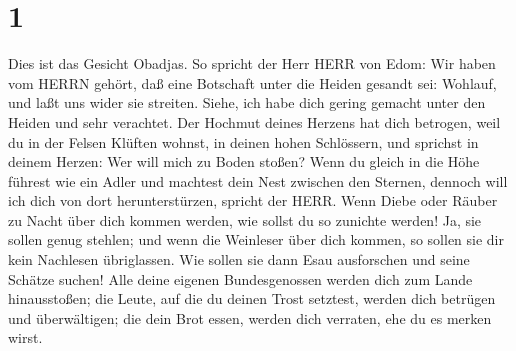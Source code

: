 \hypertarget{section}{%
\section{1}\label{section}}

 Dies ist das Gesicht Obadjas. So spricht der Herr HERR von
Edom: Wir haben vom HERRN gehört, daß eine Botschaft unter die Heiden
gesandt sei: Wohlauf, und laßt uns wider sie streiten. 
Siehe, ich habe dich gering gemacht unter den Heiden und sehr verachtet.
 Der Hochmut deines Herzens hat dich betrogen, weil du in
der Felsen Klüften wohnst, in deinen hohen Schlössern, und sprichst in
deinem Herzen: Wer will mich zu Boden stoßen?  Wenn du
gleich in die Höhe führest wie ein Adler und machtest dein Nest zwischen
den Sternen, dennoch will ich dich von dort herunterstürzen, spricht der
HERR.  Wenn Diebe oder Räuber zu Nacht über dich kommen
werden, wie sollst du so zunichte werden! Ja, sie sollen genug stehlen;
und wenn die Weinleser über dich kommen, so sollen sie dir kein
Nachlesen übriglassen.  Wie sollen sie dann Esau ausforschen
und seine Schätze suchen!  Alle deine eigenen Bundesgenossen
werden dich zum Lande hinausstoßen; die Leute, auf die du deinen Trost
setztest, werden dich betrügen und überwältigen; die dein Brot essen,
werden dich verraten, ehe du es merken wirst.

